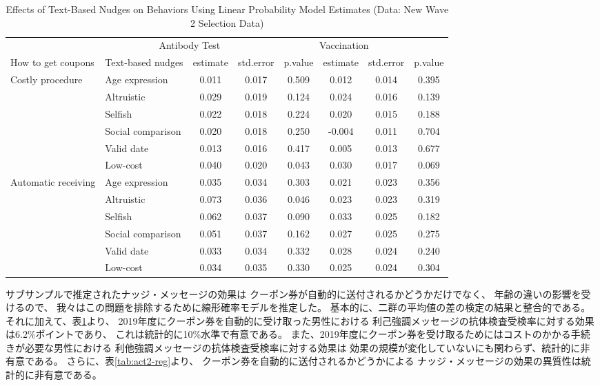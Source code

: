 \documentclass[
  11pt,
  a4paper,
]{article}
\begin{document}
\begin{table}

\caption{\label{tab:act2-reg-ftest}Effects of Text-Based Nudges on Behaviors Using Linear Probability Model Estimates (Data: New Wave 2 Selection Data)}
\centering
\begin{tabular}[t]{>{\raggedright\arraybackslash}p{5em}lcccccc}
\toprule
\multicolumn{2}{c}{ } & \multicolumn{3}{c}{Antibody Test} & \multicolumn{3}{c}{Vaccination} \\
\cmidrule(l{3pt}r{3pt}){3-5} \cmidrule(l{3pt}r{3pt}){6-8}
How to get coupons & Text-based nudges & estimate & std.error & p.value & estimate  & std.error  & p.value \\
\midrule
Costly procedure & Age expression & 0.011 & 0.017 & 0.509 & 0.012 & 0.014 & 0.395\\
 & Altruistic & 0.029 & 0.019 & 0.124 & 0.024 & 0.016 & 0.139\\
 & Selfish & 0.022 & 0.018 & 0.224 & 0.020 & 0.015 & 0.188\\
 & Social comparison & 0.020 & 0.018 & 0.250 & -0.004 & 0.011 & 0.704\\
 & Valid date & 0.013 & 0.016 & 0.417 & 0.005 & 0.013 & 0.677\\
 & Low-cost & 0.040 & 0.020 & 0.043 & 0.030 & 0.017 & 0.069\\
Automatic receiving & Age expression & 0.035 & 0.034 & 0.303 & 0.021 & 0.023 & 0.356\\
 & Altruistic & 0.073 & 0.036 & 0.046 & 0.023 & 0.023 & 0.319\\
 & Selfish & 0.062 & 0.037 & 0.090 & 0.033 & 0.025 & 0.182\\
 & Social comparison & 0.051 & 0.037 & 0.162 & 0.027 & 0.025 & 0.275\\
 & Valid date & 0.033 & 0.034 & 0.332 & 0.028 & 0.024 & 0.240\\
 & Low-cost & 0.034 & 0.035 & 0.330 & 0.025 & 0.024 & 0.304\\
\bottomrule
\end{tabular}
\end{table}

サブサンプルで推定されたナッジ・メッセージの効果は
クーポン券が自動的に送付されるかどうかだけでなく、
年齢の違いの影響を受けるので、
我々はこの問題を排除するために線形確率モデルを推定した。
基本的に、二群の平均値の差の検定の結果と整合的である。
それに加えて、表\ref{tab:act2-reg-ftest}より、
2019年度にクーポン券を自動的に受け取った男性における
利己強調メッセージの抗体検査受検率に対する効果は6.2\%ポイントであり、
これは統計的に10\%水準で有意である。
また、2019年度にクーポン券を受け取るためにはコストのかかる手続きが必要な男性における
利他強調メッセージの抗体検査受検率に対する効果は
効果の規模が変化していないにも関わらず、統計的に非有意である。
さらに、表\ref{tab:act2-reg}より、
クーポン券を自動的に送付されるかどうかによる
ナッジ・メッセージの効果の異質性は統計的に非有意である。
\end{document}
